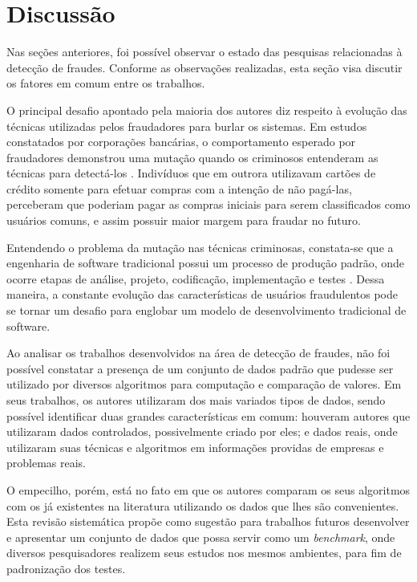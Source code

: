 \documentclass[smallextended]{svjour3}
\begin{document}
\section{Discussão}
\label{sec:5}

Nas seções anteriores, foi possível observar o estado das pesquisas relacionadas à detecção de fraudes. Conforme as observações realizadas, esta seção visa discutir os fatores em comum entre os trabalhos.

O principal desafio apontado pela maioria dos autores diz respeito à evolução das técnicas utilizadas pelos fraudadores para burlar os sistemas. Em estudos constatados por corporações bancárias, o comportamento esperado por fraudadores demonstrou uma mutação quando os criminosos entenderam as técnicas para detectá-los \citep{Bolton2002}. Indivíduos que em outrora utilizavam cartões de crédito somente para efetuar compras com a intenção de não pagá-las, perceberam que poderiam pagar as compras iniciais para serem classificados como usuários comuns, e assim possuir maior margem para fraudar no futuro.

Entendendo o problema da mutação nas técnicas criminosas, constata-se que a engenharia de software tradicional possui um processo de produção padrão, onde ocorre etapas de análise, projeto, codificação, implementação e testes \citep{sommervillesoftware}. Dessa maneira, a constante evolução das características de usuários fraudulentos pode se tornar um desafio para englobar um modelo de desenvolvimento tradicional de software. 

Ao analisar os trabalhos desenvolvidos na área de detecção de fraudes, não foi possível constatar a presença de um conjunto de dados padrão que pudesse ser utilizado por diversos algoritmos para computação e comparação de valores. Em seus trabalhos, os autores utilizaram dos mais variados tipos de dados, sendo possível identificar duas grandes características em comum: houveram autores que utilizaram dados controlados, possivelmente criado por eles; e dados reais, onde utilizaram suas técnicas e algoritmos em informações providas de empresas e problemas reais. 

O empecilho, porém, está no fato em que os autores comparam os seus algoritmos com os já existentes na literatura utilizando os dados que lhes são convenientes. Esta revisão sistemática propõe como sugestão para trabalhos futuros desenvolver e apresentar um conjunto de dados que possa servir como um \emph{benchmark}, onde diversos pesquisadores realizem seus estudos nos mesmos ambientes, para fim de padronização dos testes. 
\end{document}

